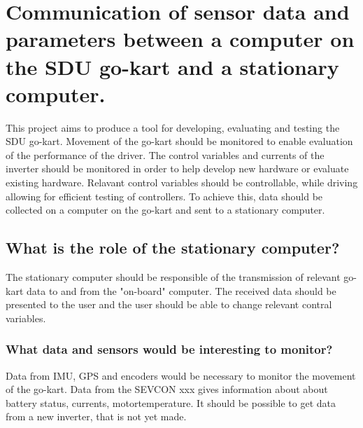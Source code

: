 
\section{Communication of sensor data and parameters between a computer on the SDU go-kart and a stationary computer.}
This project aims to produce a tool for developing, evaluating and testing the SDU go-kart.
Movement of the go-kart should be monitored to enable evaluation of the performance of the driver.
The control variables and currents of the inverter should be monitored in order to help develop new hardware or evaluate existing hardware.
Relavant control variables should be controllable, while driving allowing for efficient testing of controllers.
To achieve this, data should be collected on a computer on the go-kart and sent to a stationary computer.



\subsection{What is the role of the stationary computer?}
The stationary computer should be responsible of the transmission of relevant go-kart data to and from the "on-board" computer.
The received data should be presented to the user and the user should be able to change relevant contral variables.

\subsubsection*{What data and sensors would be interesting to monitor?}
Data from IMU, GPS and encoders would be necessary to monitor the movement of the go-kart.
Data from the SEVCON xxx gives information about about battery status, currents, motortemperature.
It should be possible to get data from a new inverter, that is not yet made. 

